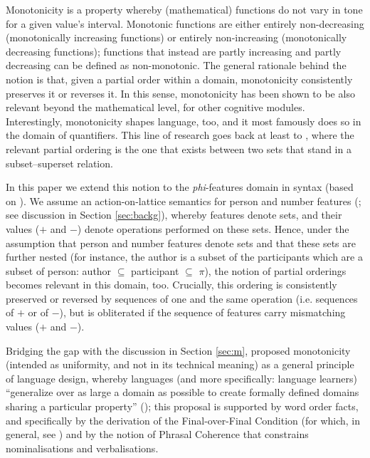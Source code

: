 \documentclass[output=paper]{langscibook}
\begin{document}
\begin{sloppypar}
Monotonicity is a property whereby (mathematical) functions do not vary in tone for a given value's interval. Monotonic functions are either entirely non-decreasing (monotonically increasing functions) or entirely non-increasing (monotonically decreasing functions); functions that instead are partly increasing and partly decreasing can be defined as non-monotonic. The general rationale behind the notion is that, given a partial order within a domain, monotonicity consistently preserves it or reverses it. In this sense, monotonicity has been shown to be also relevant beyond the mathematical level, for other cognitive modules. Interestingly, monotonicity shapes language, too, and it most famously does so in the domain of quantifiers. This line of research goes back at least to \citet{BarwiseCooper1981}, where the relevant partial ordering is the one that exists between two sets that stand in a subset--superset relation.
\end{sloppypar}

In this paper we extend this notion to the \textit{phi}-features domain in syntax (based on \citealt{Terenghi2021LAGB, Terenghi2022Sinf15, Terenghi2023}). We assume an action-on-lattice semantics for person and number features (\citealt{Harbour2008, Harbour2014, Harbour2016}; see discussion in Section \ref{sec:backg}), whereby features denote sets, and their values ($+$ and $-$) denote operations performed on these sets. Hence, under the assumption that person and number features denote sets and that these sets are further nested (for instance, the author is a subset of the participants which are a subset of person: author $\subseteq$ participant $\subseteq$ $\pi$), the notion of partial orderings becomes relevant in this domain, too. Crucially, this ordering is consistently preserved or reversed by sequences of one and the same operation (i.e. sequences of $+$ or of $-$), but is obliterated if the sequence of features carry mismatching values ($+$ and $-$). 

Bridging the gap with the discussion in Section \ref{sec:m}, \citet{Biberauer2017, Biberauer2019b} proposed monotonicity (intended as uniformity, and not in its technical meaning) as a general principle of language design, whereby languages (and more specifically: language learners) ``generalize over as large a domain as possible to create formally defined domains sharing a particular property'' (\citealt[69]{Biberauer2019b}); this proposal is supported by word order facts, and specifically by the derivation of the Final-over-Final Condition (for which, in general, see \citealt{SheehanEtAl2017}) and by the notion of Phrasal Coherence that constrains nominalisations and verbalisations.
\end{document}
